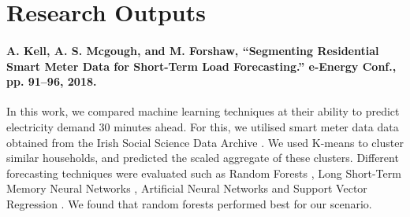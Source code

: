 \documentclass[12pt]{article}
\begin{document}
%





\clearpage

\clearpage

\section{Research Outputs}

\paragraph{A. Kell, A. S. Mcgough, and M. Forshaw, ``Segmenting Residential Smart Meter Data for Short-Term Load Forecasting.'' e-Energy Conf., pp. 91--96, 2018. \cite{Kell2018}
}
In this work, we compared machine learning techniques at their ability to predict electricity demand 30 minutes ahead. For this, we utilised smart meter data data obtained from the Irish Social Science Data Archive \cite{cer_2012}. We used K-means \cite{Forgy65} to cluster similar households, and predicted the scaled aggregate of these clusters. Different forecasting techniques were evaluated such as Random Forests \cite{TinKamHo}, Long Short-Term Memory Neural Networks \cite{lstm}, Artificial Neural Networks \cite{book:984557} and Support Vector Regression \cite{Drucker1997}. We found that random forests performed best for our scenario.
\end{document}
